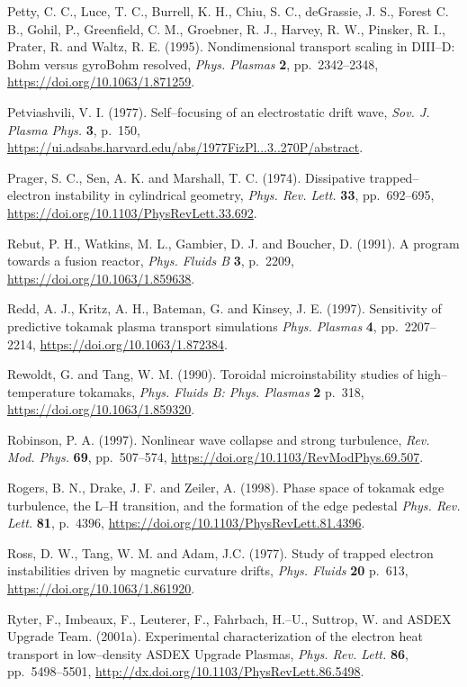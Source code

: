 \documentclass[a4paper,openany,12pt]{book}
\begin{document}
{\begin{thebibliography}{100}
\bibitem{}
 Petty, C. C., Luce, T. C., Burrell, K. H., Chiu, S. C., deGrassie, J. S., Forest C. B., Gohil, P., Greenfield, C. M., Groebner, R. J., Harvey, R. W., Pinsker, R. I., Prater, R. and Waltz, R. E.  (1995). Nondimensional transport scaling in DIII--D: Bohm versus gyroBohm resolved, {\em Phys. Plasmas} \textbf{2}, pp.~2342--2348,
\url{https://doi.org/10.1063/1.871259}.

\bibitem{}
Petviashvili, V. I. (1977). Self--focusing of an electrostatic drift wave,
 {\em Sov. J. Plasma Phys.} \textbf{3}, p.~150, \url{https://ui.adsabs.harvard.edu/abs/1977FizPl...3..270P/abstract}.

\bibitem{}
Prager, S. C., Sen, A. K. and Marshall, T. C. (1974). Dissipative trapped--electron instability in cylindrical geometry, 
\emph{Phys. Rev. Lett.} \textbf{33}, pp.~692--695, \url{https://doi.org/10.1103/PhysRevLett.33.692}.

\bibitem{}
 Rebut, P. H., Watkins, M. L., Gambier, D. J. and Boucher, D. (1991).
 A program towards a fusion reactor, {\em Phys. Fluids B} \textbf{3}, p.~2209, 
\url{https://doi.org/10.1063/1.859638}.

\bibitem{}
Redd, A. J., Kritz, A. H., Bateman, G. and Kinsey, J. E. (1997). Sensitivity of predictive tokamak plasma transport simulations \emph{Phys. Plasmas} \textbf{4}, pp.~2207--2214, \url{https://doi.org/10.1063/1.872384}.

\bibitem{}
Rewoldt, G. and Tang, W. M. (1990). Toroidal microinstability studies of high--temperature tokamaks, \emph{Phys. Fluids B: Phys. Plasmas} \textbf{2} p.~318, \url{https://doi.org/10.1063/1.859320}.

\bibitem{} 
Robinson, P. A. (1997). Nonlinear wave collapse and strong turbulence, {\em Rev. Mod. Phys.} \textbf{69}, 
pp.~507--574, \url{https://doi.org/10.1103/RevModPhys.69.507}.

\bibitem{}
Rogers, B. N., Drake, J. F. and Zeiler, A. (1998). Phase space of tokamak edge turbulence, the L--H transition, and the formation of the edge pedestal {\em Phys. Rev. Lett.} \textbf{81}, p.~4396, 
\url{https://doi.org/10.1103/PhysRevLett.81.4396}.

\bibitem{}
Ross, D. W., Tang, W. M. and Adam, J.C. (1977). Study of trapped electron instabilities driven by magnetic curvature drifts, \emph{Phys. Fluids} \textbf{20} p.~613, \url{https://doi.org/10.1063/1.861920}.

\bibitem{}
Ryter, F., Imbeaux, F., Leuterer, F., Fahrbach, H.--U., Suttrop, W. and ASDEX Upgrade Team. (2001a). Experimental characterization of the electron heat transport in low--density ASDEX Upgrade Plasmas, \emph{Phys. Rev. Lett.} \textbf{86}, pp.~5498--5501, \url{http://dx.doi.org/10.1103/PhysRevLett.86.5498}.


\end{thebibliography}}
\end{document}
